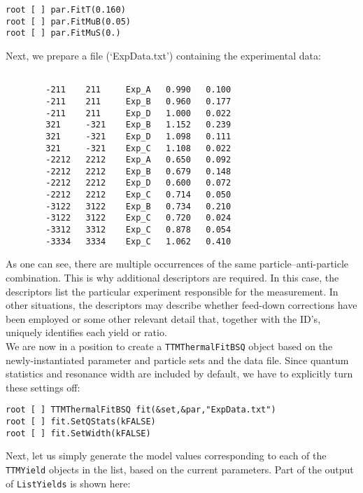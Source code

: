 \documentclass{elsarticle}
\begin{document}
\small
\begin{verbatim}
root [ ] par.FitT(0.160)
root [ ] par.FitMuB(0.05)
root [ ] par.FitMuS(0.)
\end{verbatim}
\normalsize

\noindent
Next, we prepare a file (`ExpData.txt') containing the experimental data:

\small
\begin{verbatim}

        -211    211     Exp_A   0.990   0.100
        -211    211     Exp_B   0.960   0.177
        -211    211     Exp_D   1.000   0.022
        321     -321    Exp_B   1.152   0.239
        321     -321    Exp_D   1.098   0.111
        321     -321    Exp_C   1.108   0.022
        -2212   2212    Exp_A   0.650   0.092
        -2212   2212    Exp_B   0.679   0.148
        -2212   2212    Exp_D   0.600   0.072
        -2212   2212    Exp_C   0.714   0.050
        -3122   3122    Exp_B   0.734   0.210
        -3122   3122    Exp_C   0.720   0.024
        -3312   3312    Exp_C   0.878   0.054
        -3334   3334    Exp_C   1.062   0.410
\end{verbatim}
\normalsize

\noindent
As one can see, there are multiple occurrences of the same particle--anti-particle combination. This is why 
additional descriptors are required. In this case, the descriptors list the particular experiment 
responsible for the measurement. In other situations, the descriptors may describe whether feed-down corrections 
have been employed or some other relevant detail that, together with the ID's, uniquely identifies each yield or ratio.\\   

We are now in a position to create a \texttt{TTMThermalFitBSQ} object based on the newly-instantiated 
parameter 
and particle sets and the data file. Since quantum statistics and resonance width are included by default, 
we have to explicitly turn these settings off: 

\small
\begin{verbatim}
root [ ] TTMThermalFitBSQ fit(&set,&par,"ExpData.txt")
root [ ] fit.SetQStats(kFALSE)
root [ ] fit.SetWidth(kFALSE)
\end{verbatim}
\normalsize

\noindent
Next, let us simply generate the model values corresponding to each of the \texttt{TTMYield} objects in the list, based on the current parameters. Part of the output of \texttt{ListYields} is shown here: 
\end{document}

